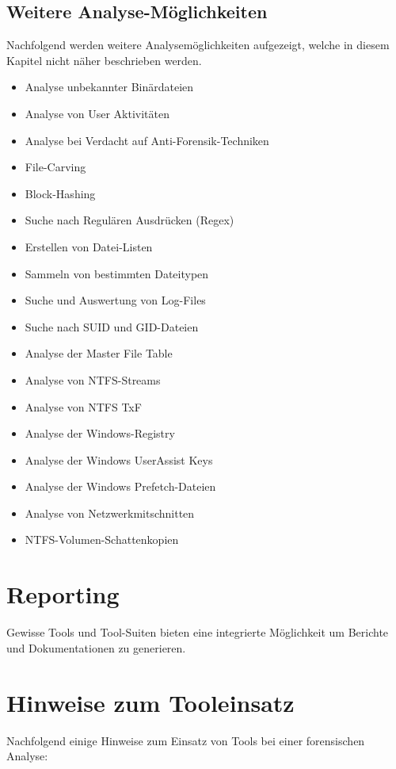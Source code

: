 \subsection{Weitere Analyse-Möglichkeiten}
Nachfolgend werden weitere Analysemöglichkeiten aufgezeigt, welche in diesem Kapitel nicht näher beschrieben werden.
\begin{itemize}
\item Analyse unbekannter Binärdateien
\item Analyse von User Aktivitäten
\item Analyse bei Verdacht auf Anti-Forensik-Techniken
\item File-Carving
\item Block-Hashing
\item Suche nach Regulären Ausdrücken (Regex)
\item Erstellen von Datei-Listen
\item Sammeln von bestimmten Dateitypen
\item Suche und Auswertung von Log-Files
\item Suche nach SUID und GID-Dateien
\item Analyse der Master File Table
\item Analyse von NTFS-Streams
\item Analyse von NTFS TxF
\item Analyse der Windows-Registry
\item Analyse der Windows UserAssist Keys
\item Analyse der Windows Prefetch-Dateien
\item Analyse von Netzwerkmitschnitten
\item NTFS-Volumen-Schattenkopien
\end{itemize}


\section{Reporting}
Gewisse Tools und Tool-Suiten bieten eine integrierte Möglichkeit um Berichte und Dokumentationen zu generieren. 


\section{Hinweise zum Tooleinsatz}
Nachfolgend einige Hinweise zum Einsatz von Tools bei einer forensischen Analyse:


